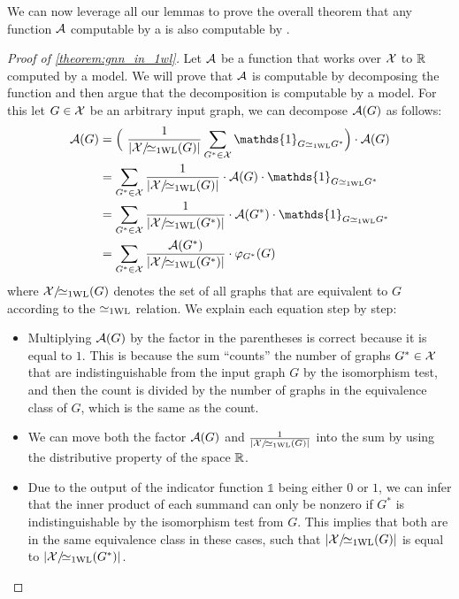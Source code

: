 We can now leverage all our lemmas to prove the overall theorem that any function $\mathcal{A}$ computable by a \gnn is also computable by \wlnn.
\begin{proof}[Proof of \cref{theorem:gnn_in_1wl}]\label{prof:gnn_in_1wl}
    Let $\mathcal{A}$ be a function that works over $\mathcal{X}$ to $\mathbb{R}$ computed by a \gnn model. We will prove that $\mathcal{A}$ is \wlnn computable by decomposing the function and then argue that the decomposition is computable by a \wlnn model. For this let $G \in \mathcal{X}$ be an arbitrary input graph, we can decompose $\mathcal{A}(G)$ as follows:
    \begin{align}
        \cA(G) &= \Bigl( \ \frac{1}{|\cX/\!{\wliso}(G)|}\sum_{G^* \in \cX} \mathds{1}_{G \wliso G^*} \Bigr) \cdot \cA(G) \label{eq:gnn_decomposition1}\\
        &= \sum_{G^* \in \cX} \frac{1}{|\cX/\!{\wliso}(G)|} \cdot \cA(G) \cdot \mathds{1}_{G \wliso G^*} \label{eq:gnn_decomposition2}\\
        &= \sum_{G^* \in \cX} \frac{1}{|\cX/\!{\wliso}(G^*)|} \cdot \cA(G^*) \cdot \mathds{1}_{G \wliso G^*} \label{eq:gnn_decomposition3}\\
        &= \sum_{G^* \in \cX} \frac{\cA(G^*)}{|\cX/\!{\wliso}(G^*)|}  \cdot \varphi_{G^*}(G) \label{eq:gnn_decomposition4}
    \end{align}
    where $\mathcal{X}/\!{\simeq_{\text{1WL}}}(G)$ denotes the set of all graphs that are equivalent to $G$ according to the $\simeq_{\text{1WL}}$ relation. We explain each equation step by step:
    \begin{itemize}[leftmargin=9em]
        \item[\cref*{eq:gnn_decomposition1}:] Multiplying $\mathcal{A}(G)$ by the factor in the parentheses is correct because it is equal to $1$. This is because the sum ``counts'' the number of graphs $G^* \in \mathcal{X}$ that are indistinguishable from the input graph $G$ by the \wl isomorphism test, and then the count is divided by the number of graphs in the equivalence class of $G$, which is the same as the count.
        \item[\cref*{eq:gnn_decomposition2}:] We can move both the factor $\mathcal{A}(G)$ and $\frac{1}{|\mathcal{X}/\!{\simeq_{\text{1WL}}}(G)|}$ into the sum by using the distributive property of the space $\mathbb{R}$.     
        \item[\cref*{eq:gnn_decomposition3}:] Due to the output of the indicator function $\mathds{1}$ being either $0$ or $1$, we can infer that the inner product of each summand can only be nonzero if $G^*$ is indistinguishable by the \wl isomorphism test from $G$. This implies that both are in the same equivalence class in these cases, such that $|\mathcal{X}/\!{\simeq_{\text{1WL}}}(G)|$ is equal to $|\mathcal{X}/\!{\simeq_{\text{1WL}}}(G^*)|$.\\

\end{itemize}
\end{proof}
